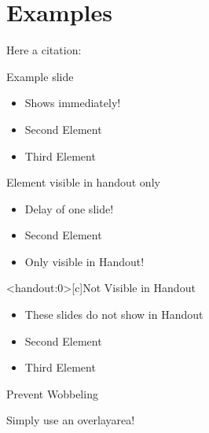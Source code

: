\section{Examples}

\begin{frame}[c]
     Here a citation: \cite{benchcpp}
\end{frame}




\begin{frame}[c]{Example slide}
    \Large
    \begin{itemize}[<+->]
        \item Shows immediately!
        \item Second Element
        \item Third Element
    \end{itemize}
\end{frame}


\begin{frame}[c]{Element visible in handout only}
    \Large
    \begin{itemize}[<+(1)->]
        \item Delay of one slide!
        \item Second Element
        \item<handout> Only visible in Handout!
    \end{itemize}
\end{frame}


\begin{frame}<handout:0>[c]{Not Visible in Handout}
    \Large
    \begin{itemize}[<+(1)->]
        \item These slides do not show in Handout
        \item Second Element
        \item Third Element
    \end{itemize}
\end{frame}


\begin{frame}[c]{Prevent Wobbeling}

    Simply use an overlayarea!


\end{frame}
